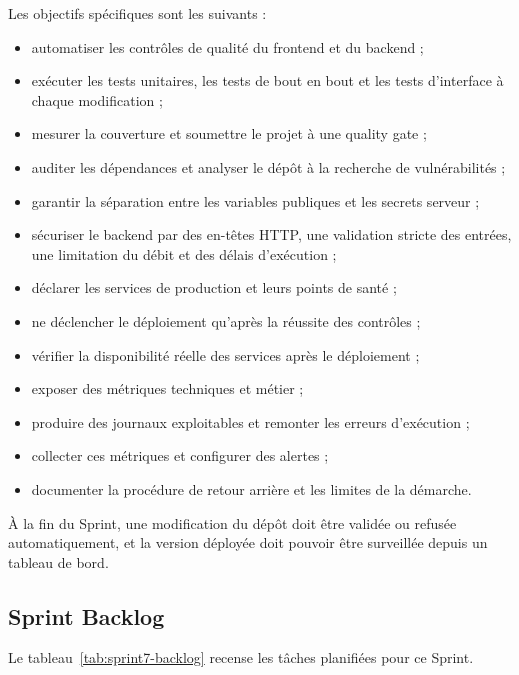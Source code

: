 Les objectifs spécifiques sont les suivants :

\begin{itemize}
    \item automatiser les contrôles de qualité du frontend et du backend ;
    \item exécuter les tests unitaires, les tests de bout en bout et les tests d'interface à chaque modification ;
    \item mesurer la couverture et soumettre le projet à une quality gate ;
    \item auditer les dépendances et analyser le dépôt à la recherche de vulnérabilités ;
    \item garantir la séparation entre les variables publiques et les secrets serveur ;
    \item sécuriser le backend par des en-têtes HTTP, une validation stricte des entrées, une limitation du débit et des délais d'exécution ;
    \item déclarer les services de production et leurs points de santé ;
    \item ne déclencher le déploiement qu'après la réussite des contrôles ;
    \item vérifier la disponibilité réelle des services après le déploiement ;
    \item exposer des métriques techniques et métier ;
    \item produire des journaux exploitables et remonter les erreurs d'exécution ;
    \item collecter ces métriques et configurer des alertes ;
    \item documenter la procédure de retour arrière et les limites de la démarche.
\end{itemize}

À la fin du Sprint, une modification du dépôt doit être validée ou refusée automatiquement, et la version déployée doit pouvoir être surveillée depuis un tableau de bord.

\subsection{Sprint Backlog}

Le tableau~\ref{tab:sprint7-backlog} recense les tâches planifiées pour ce Sprint.

